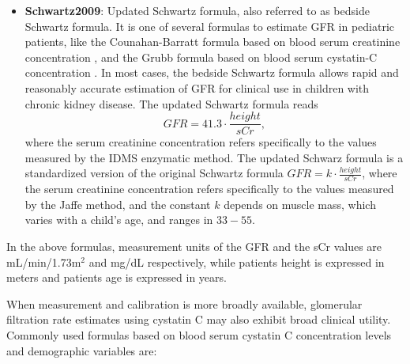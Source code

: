 \documentclass[10pt,final]{siamltex}
\begin{document}
\begin{itemize}
\item \textbf{Schwartz2009}: Updated Schwartz formula, also referred to as bedside Schwartz formula. It is one of several formulas to estimate GFR in pediatric patients, like the Counahan-Barratt formula based on blood serum creatinine concentration \cite{Counahan}, and the Grubb formula based on blood serum cystatin-C concentration \cite{simonsen}. In most cases, the bedside Schwartz formula allows rapid and reasonably accurate estimation of GFR for clinical use in children with chronic kidney disease. The updated Schwartz formula reads
%
\begin{equation}
 \mathit{GFR} = 41.3 \cdot \frac{height}{sCr},
\end{equation}
%
where the serum creatinine concentration refers specifically to the values measured by the IDMS enzymatic method. The updated Schwarz formula is a standardized version of the original Schwartz formula $\mathit{GFR} = k \cdot \tfrac{height}{sCr}$, where the serum creatinine concentration refers specifically to the values measured by the Jaffe method, and the constant $k$ depends on muscle mass, which varies with a child's age, and ranges in $33-55$.
\end{itemize}

In the above formulas, measurement units of the GFR and the sCr values are mL/min/1.73m$^2$ and mg/dL respectively, while patients height is expressed in meters and patients age is expressed in years. %

When measurement and calibration is more broadly available, glomerular filtration rate estimates using cystatin C may also exhibit broad clinical utility. Commonly used formulas based on blood serum cystatin C concentration levels and demographic variables are:
\end{document}
